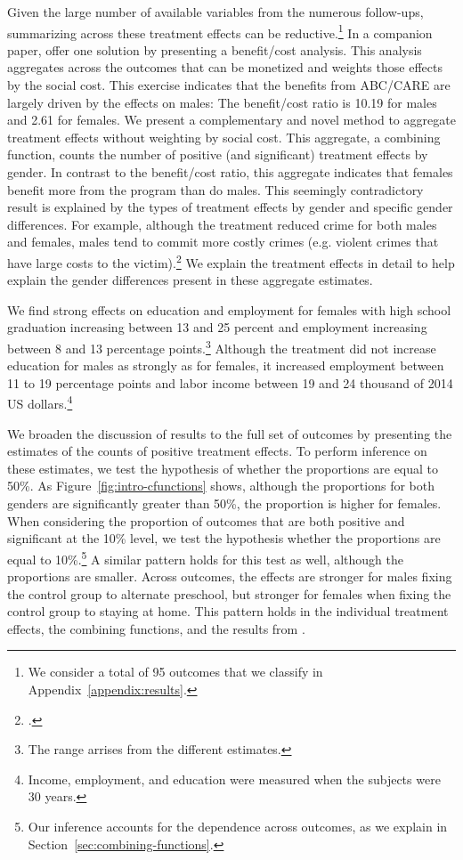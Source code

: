 Given the large number of available variables from the numerous follow-ups, summarizing across these treatment effects can be reductive.\footnote{We consider a total of 95 outcomes that we classify in Appendix~\ref{appendix:results}.} In a companion paper, \citet{Garcia_Heckman_Leaf_etal_2017_Comp_CBA_Unpublished} offer one solution by presenting a benefit/cost analysis. This analysis aggregates across the outcomes that can be monetized and weights those effects by the social cost. This exercise indicates that the benefits from ABC/CARE are largely driven by the effects on males: The benefit/cost ratio is 10.19 for males and 2.61 for females. We present a complementary and novel method to aggregate treatment effects without weighting by social cost. This aggregate, a combining function, counts the number of positive (and significant) treatment effects by gender. In contrast to the benefit/cost ratio, this aggregate indicates that females benefit more from the program than do males. This seemingly contradictory result is explained by the types of treatment effects by gender and specific gender differences. For example, although the treatment reduced crime for both males and females, males tend to commit more costly crimes (e.g. violent crimes that have large costs to the victim).\footnote{\citet{Cohen-Bowles_2010_Estimating-Cost-Crime,Gregg_etal_2015_SocialRealities_BOOK}.} We explain the treatment effects in detail to help explain the gender differences present in these aggregate estimates.

We find strong effects on education and employment for females with high school graduation increasing between 13 and 25 percent and employment increasing between 8 and 13 percentage points.\footnote{The range arrises from the different estimates.} Although the treatment did not increase education for males as strongly as for females, it increased employment between 11 to 19 percentage points and labor income between 19 and 24 thousand of 2014 US dollars.\footnote{Income, employment, and education were measured when the subjects were 30 years.} 

We broaden the discussion of results to the full set of outcomes by presenting the estimates of the counts of positive treatment effects. To perform inference on these estimates, we test the hypothesis of whether the proportions are equal to 50\%. As Figure~\ref{fig:intro-cfunctions} shows, although the proportions for both genders are significantly greater than 50\%, the proportion is higher for females. When considering the proportion of outcomes that are both positive and significant at the 10\% level, we test the hypothesis whether the proportions are equal to 10\%.\footnote{Our inference accounts for the dependence across outcomes, as we explain in Section~\ref{sec:combining-functions}.} A similar pattern holds for this test as well, although the proportions are smaller. Across outcomes, the effects are stronger for males fixing the control group to alternate preschool, but stronger for females when fixing the control group to staying at home. This pattern holds in the individual treatment effects, the combining functions, and the results from \citet{Garcia_Heckman_Leaf_etal_2017_Comp_CBA_Unpublished}.

